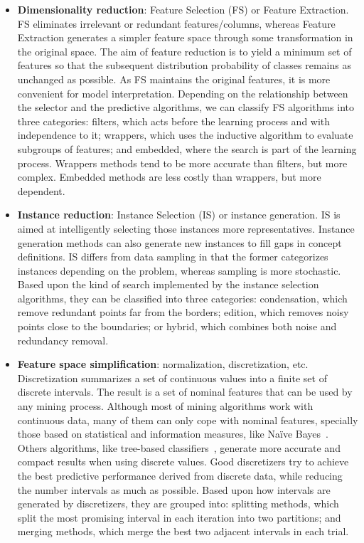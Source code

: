 \documentclass[preprint,12pt]{elsarticle}
\begin{document}
\begin{itemize}
	\item \textbf{Dimensionality reduction}: Feature Selection (FS) or Feature Extraction. FS eliminates irrelevant or redundant features/columns, whereas Feature Extraction generates a simpler feature space through some transformation in the original space. The aim of feature reduction is to yield a minimum set of features so that the subsequent distribution probability of classes remains as unchanged as possible. As FS maintains the
original features, it is more convenient for model interpretation. Depending on the relationship between the selector and the predictive algorithms, we can classify FS algorithms into three categories: filters, which acts before the learning process and with independence to it; wrappers, which uses the inductive algorithm to evaluate subgroups of features; and embedded, where the search is part of the learning process. Wrappers methods tend to be more accurate than filters, but more complex. Embedded methods are less costly than wrappers, but more dependent.
	\item \textbf{Instance reduction}: Instance Selection (IS) or instance generation. IS is aimed at intelligently selecting those instances more representatives. Instance generation methods can also generate new instances to fill gaps in concept definitions. IS differs from data sampling in that the former categorizes instances depending on the problem, whereas sampling is more stochastic. Based upon the kind of search implemented by the instance selection algorithms, they can be classified into three categories: condensation, which remove redundant points far from the borders; edition, which removes noisy points close to the boundaries; or hybrid, which combines both noise and redundancy removal.
	\item \textbf{Feature space simplification}: normalization, discretization, etc. Discretization summarizes a set of continuous values into a finite set of discrete intervals. The result is a set of nominal features that can be used by any mining process. Although most of mining algorithms work with continuous data, many of them can only cope with nominal features, specially those based on statistical and information measures, like Na\"ive Bayes~\cite{yang09}. Others algorithms, like tree-based classifiers~\cite{hu09}, generate more accurate and compact results when using discrete values. Good discretizers try to achieve the best predictive performance derived from discrete data, while reducing the number intervals as much as possible. Based upon how intervals are generated by discretizers, they are grouped into: splitting methods, which split the most promising interval in each iteration into two partitions; and merging methods, which merge the best two adjacent intervals in each trial.
\end{itemize}
\end{document}

